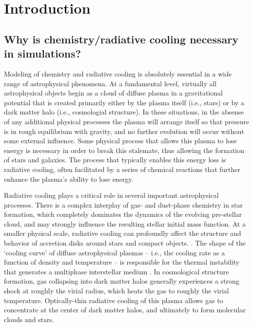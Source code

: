 \section{Introduction} \label{sec:intro}

\subsection{Why is chemistry/radiative cooling necessary in
  simulations?}


Modeling of chemistry and radiative cooling is absolutely essential in
a wide range of astrophysical phenomena.  At a fundamental level,
virtually all astrophysical objects begin as a cloud of diffuse plasma
in a gravitational potential that is created primarily either by the
plasma itself (i.e., stars) or by a dark matter halo (i.e.,
cosmologial structure).  In these situations, in the absense of any
additional physical processes the plasma will arrange itself so that
pressure is in rough equilibrium with gravity, and no further
evolution will occur without some external influence.  Some physical
process that allows this plasma to lose energy is necessary in order
to break this stalemate, thus allowing the formation of stars and
galaxies.  The process that typically enables this energy loss is
radiative cooling, often facilitated by a series of chemical reactions
that further
enhance the plasma's ability to lose energy.

Radiative cooling plays a critical role in several important
astrophysical processes.  There is a complex interplay of gas- and
dust-phase chemistry in star formation, which completely dominates the
dynamics of the evolving pre-stellar cloud, and may strongly influence
the resulting stellar initial mass function.   At a smaller physical scale, radiative cooling can
profoundly affect the structure and behavior of accretion disks around
stars and compact objects.  .  The shape
of the `cooling curve' of diffuse astrophysical plasmas -- i.e., the
cooling rate as a function of density and temperature -- is
responsible for the thermal instability that generates a multiphase
interstellar medium .  In cosmological structure formation, gas collapsing into dark
matter halos generally experiences a strong shock at roughly the
virial radius, which heats the gas to roughly the virial temperature.
Optically-thin radiative cooling of this plasma allows gas to
concentrate at the center of dark matter halos, and ultimately to form
molecular clouds and stars.  

